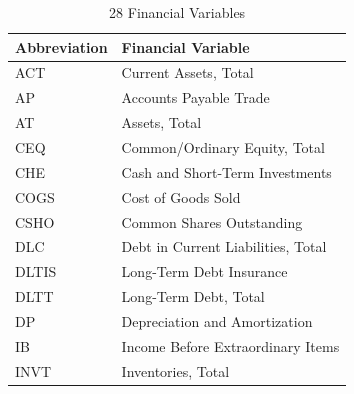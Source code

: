 \documentclass[conference]{IEEEtran}
\begin{document}
\label{AA}
\begin{table}[htbp]
\caption{28 Financial Variables}
\centering
\begin{tabular}{@{}p{3.4cm}p{5cm}@{}} 
\toprule
\textbf{\hspace{5mm}Abbreviation} & \textbf{Financial Variable\hspace{5mm}} \\
\midrule
\hspace{5mm}ACT & Current Assets, Total\hspace{5mm} \\
\hspace{5mm}AP & Accounts Payable Trade\hspace{5mm} \\
\hspace{5mm}AT & Assets, Total\hspace{5mm} \\
\hspace{5mm}CEQ & Common/Ordinary Equity, Total\hspace{5mm} \\
\hspace{5mm}CHE & Cash and Short-Term Investments\hspace{5mm} \\
\hspace{5mm}COGS & Cost of Goods Sold\hspace{5mm} \\
\hspace{5mm}CSHO & Common Shares Outstanding\hspace{5mm} \\
\hspace{5mm}DLC & Debt in Current Liabilities, Total\hspace{5mm} \\
\hspace{5mm}DLTIS & Long-Term Debt Insurance\hspace{5mm} \\
\hspace{5mm}DLTT & Long-Term Debt, Total\hspace{5mm} \\
\hspace{5mm}DP & Depreciation and Amortization\hspace{5mm} \\
\hspace{5mm}IB & Income Before Extraordinary Items\hspace{5mm} \\
\hspace{5mm}INVT & Inventories, Total\hspace{5mm} \\

\end{tabular}
\end{table}
\end{document}

